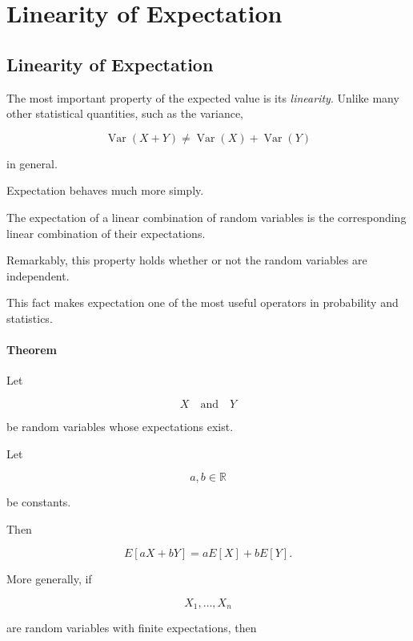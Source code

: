 \documentclass[11pt]{article}
\begin{document}
	\section{Linearity of Expectation}
	\begin{mdframed}[
		linewidth=0.8pt,
		roundcorner=6pt,
		backgroundcolor=gray!5,
		linecolor=gray!60,
		innertopmargin=10pt,
		innerbottommargin=10pt,
		innerleftmargin=10pt,
		innerrightmargin=10pt
		]
		
		\subsection*{Linearity of Expectation}
		
		The most important property of the expected value is its \emph{linearity}.
		Unlike many other statistical quantities, such as the variance,
		
		\[
		\operatorname{Var}(X+Y)
		\neq
		\operatorname{Var}(X)+\operatorname{Var}(Y)
		\]
		
		in general.
		
		Expectation behaves much more simply.
		
		The expectation of a linear combination of random variables is the
		corresponding linear combination of their expectations.
		
		Remarkably, this property holds whether or not the random variables are
		independent.
		
		This fact makes expectation one of the most useful operators in probability
		and statistics.
		
		\bigskip
		
		\paragraph{Theorem}
		
		Let
		
		\[
		X
		\quad\text{and}\quad
		Y
		\]
		
		be random variables whose expectations exist.
		
		Let
		
		\[
		a,b\in\mathbb R
		\]
		
		be constants.
		
		Then
		
		\[
		\boxed{
			E[aX+bY]
			=
			aE[X]+bE[Y].
		}
		\]
		
		More generally, if
		
		\[
		X_1,\ldots,X_n
		\]
		
		are random variables with finite expectations, then
		

\end{mdframed}
\end{document}
